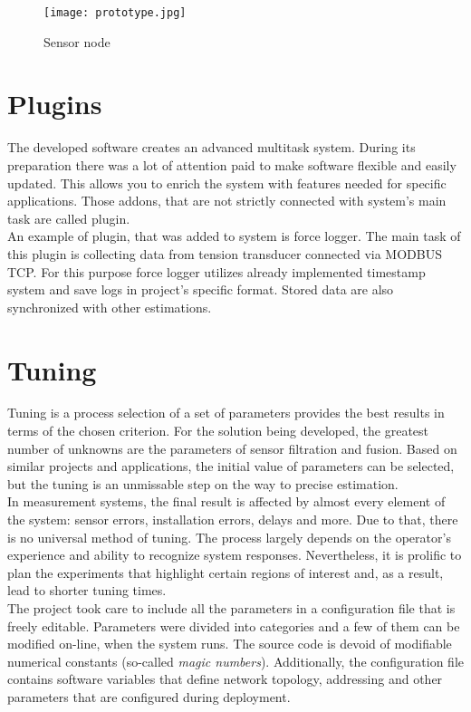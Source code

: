 \begin{figure}
	\begin{center}
		\texttt{[image: prototype.jpg]}
	\end{center}
	\caption{Sensor node}
	\label{prototype}
\end{figure}

\section{Plugins}

The developed software creates an advanced multitask system. During its preparation there was a lot of attention paid to make software flexible and easily updated. This allows you to enrich the system with features needed for specific applications. Those addons, that are not strictly connected with system's main task are called plugin.\\

An example of plugin, that was added to system is force logger. The main task of this plugin is collecting data from tension transducer connected via MODBUS TCP. For this purpose force logger utilizes already implemented timestamp system and save logs in project's specific format. Stored data are also synchronized with other estimations.

\section{Tuning}

Tuning is a process selection of a set of parameters provides the best results in terms of the chosen criterion. For the solution being developed, the greatest number of unknowns are the parameters of sensor filtration and fusion. Based on similar projects and applications, the initial value of parameters can be selected, but the tuning is an unmissable step on the way to precise estimation.\\

In measurement systems, the final result is affected by almost every element of the system: sensor errors, installation errors, delays and more. Due to that, there is no universal method of tuning. The process largely depends on the operator's experience and ability to recognize system responses. Nevertheless, it is prolific to plan the experiments that highlight certain regions of interest and, as a result, lead to shorter tuning times.\\

The project took care to include all the parameters in a configuration file that is freely editable. Parameters were divided into categories and a few of them can be modified on-line, when the system runs. The source code is devoid of modifiable numerical constants (so-called \textit{magic numbers}). Additionally, the configuration file contains software variables that define network topology, addressing and other parameters that are configured during deployment.

